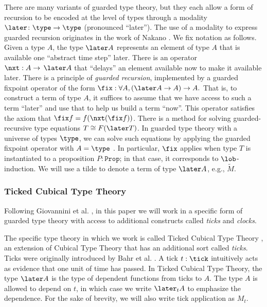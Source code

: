 \documentclass[acmsmall,screen,review,anonymous]{acmart}
\theoremstyle{remark}
\begin{document}
There are many variants of guarded type theory, but they each allow a form of
recursion to be encoded at the level of types through a modality $\later \colon
\type \to \type$ (pronounced ``later''). The use of a modality to express
guarded recursion originates in the work of Nakano \cite{Nakano2000}.
We fix notation as follows.
Given a type $A$, the type $\later A$ represents an element of type $A$ that
is available one ``abstract time step'' later. There is an operator $\nxt : A
\to\, \later A$ that ``delays'' an element available now to make it available
later. There is a principle of \emph{guarded recursion}, implemented by a
guarded fixpoint operator of the form $\fix : \forall A, (\later A \to A)
\to A.$ That is, to construct a term of type $A$, it suffices to assume that
we have access to such a term ``later'' and use that to help us build a term
``now''. This operator satisfies the axiom that $\fix f = f (\nxt (\fix f))$.
There is a method for solving guarded-recursive type equations $T \cong
F(\later T)$. In guarded type theory with a universe of types $\type$, we can
solve such equations by applying the guarded fixpoint operator with $A =
\type$ \cite{birkedal-møgelberg-2013}. In particular, $\fix$ applies when
type $T$ is instantiated to a proposition $P : \texttt{Prop}$; in that case,
it corresponds to $\lob$-induction.
We will use a tilde to denote a term of type $\later A$, e.g., $\tilde{M}$.

\subsubsection{Ticked Cubical Type Theory}

Following Giovannini et al. \cite{gtt-sgdt}, in this paper we will work in a
specific form of guarded type theory with access to additional constructs called
\emph{ticks} and \emph{clocks}.

The specific type theory in which we work is called Ticked Cubical Type Theory
\cite{mogelberg-veltri2019}, an extension of Cubical Type Theory
\cite{CohenCoquandHuberMortberg2017} that has an additional sort called
\emph{ticks}. Ticks were originally introduced by Bahr et al.
\cite{bahr-grathwohl-bugge-mogelberg2017}. A tick $t : \tick$ intuitively acts
as evidence that one unit of time has passed. In Ticked Cubical Type Theory, the
type $\later A$ is the type of dependent functions from ticks to $A$. The type
$A$ is allowed to depend on $t$, in which case we write $\later_t A$ to
emphasize the dependence.
%
For the sake of brevity, we will also write tick application as $M_t$. 
\end{document}
